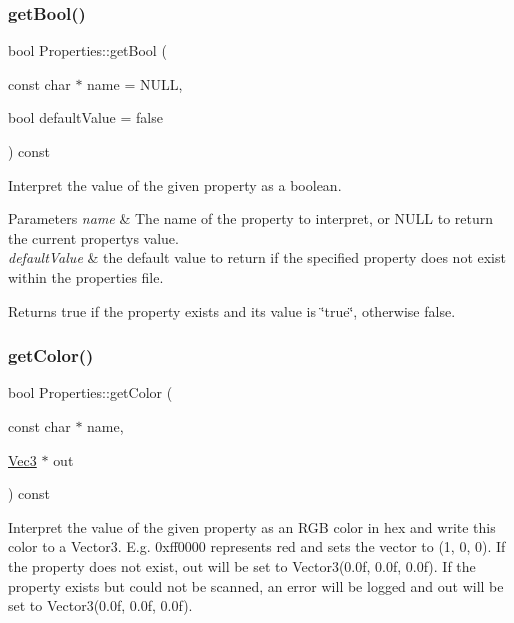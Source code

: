 \subsubsection{\texorpdfstring{get\+Bool()}{getBool()}\hspace{0.1cm}{\footnotesize\ttfamily [2/2]}}
{\footnotesize\ttfamily bool Properties\+::get\+Bool (\begin{DoxyParamCaption}\item[{const char $\ast$}]{name = {\ttfamily NULL},  }\item[{bool}]{default\+Value = {\ttfamily false} }\end{DoxyParamCaption}) const}

Interpret the value of the given property as a boolean.


\begin{DoxyParams}{Parameters}
{\em name} & The name of the property to interpret, or N\+U\+LL to return the current property\textquotesingle{}s value. \\
\hline
{\em default\+Value} & the default value to return if the specified property does not exist within the properties file.\\
\hline
\end{DoxyParams}
\begin{DoxyReturn}{Returns}
true if the property exists and its value is \char`\"{}true\char`\"{}, otherwise false. 
\end{DoxyReturn}
\mbox{\label{classProperties_aef61d49b456e4efbf6668a079b14780d}} 
\subsubsection{\texorpdfstring{get\+Color()}{getColor()}\hspace{0.1cm}{\footnotesize\ttfamily [1/4]}}
{\footnotesize\ttfamily bool Properties\+::get\+Color (\begin{DoxyParamCaption}\item[{const char $\ast$}]{name,  }\item[{\hyperlink{classVec3}{Vec3} $\ast$}]{out }\end{DoxyParamCaption}) const}

Interpret the value of the given property as an R\+GB color in hex and write this color to a Vector3. E.\+g. 0xff0000 represents red and sets the vector to (1, 0, 0). If the property does not exist, out will be set to Vector3(0.\+0f, 0.\+0f, 0.\+0f). If the property exists but could not be scanned, an error will be logged and out will be set to Vector3(0.\+0f, 0.\+0f, 0.\+0f).


